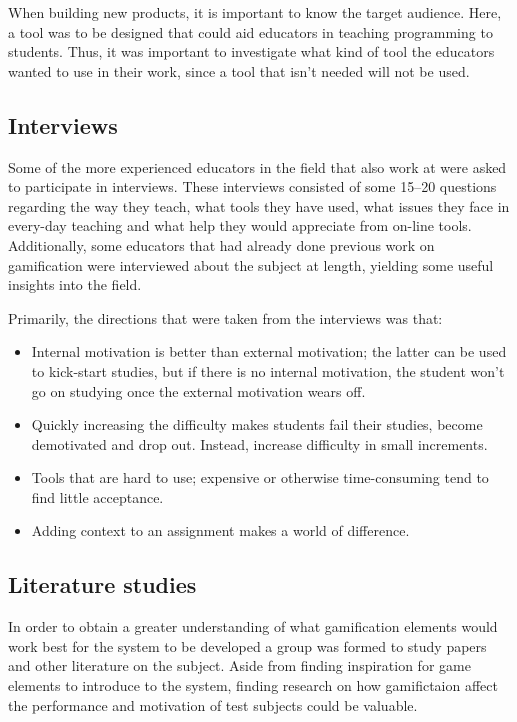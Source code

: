 When building new products, it is important to know the target audience. Here, a tool was to be designed that could aid educators in teaching programming to students. Thus, it was important to investigate what kind of tool the educators wanted to use in their work, since a tool that isn't needed will not be used.

\subsection{Interviews}
Some of the more experienced educators in the field that also work at \LTU{} were asked to participate in interviews. These interviews consisted of some 15--20 questions regarding the way they teach, what tools they have used, what issues they face in every-day teaching and what help they would appreciate from on-line tools. Additionally, some educators that had already done previous work on gamification were interviewed about the subject at length, yielding some useful insights into the field.

Primarily, the directions that were taken from the interviews was that:
\begin{itemize}
\item Internal motivation is better than external motivation; the latter can be used to kick-start studies, but if there is no internal motivation, the student won't go on studying once the external motivation wears off.
\item Quickly increasing the difficulty makes students fail their studies, become demotivated and drop out. Instead, increase difficulty in small increments.
\item Tools that are hard to use; expensive or otherwise time-consuming tend to find little acceptance.
\item Adding context to an assignment makes a world of difference.
\end{itemize}

\subsection{Literature studies}
In order to obtain a greater understanding of what gamification elements would work best for the system to be developed a group was formed to study papers and other literature on the subject. Aside from finding inspiration for game elements to introduce to the system, finding research on how gamifictaion affect the performance and motivation of test subjects could be valuable.

